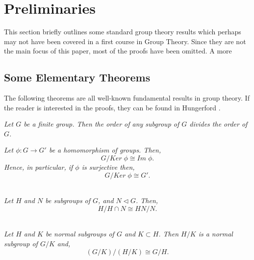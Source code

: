 \chapter{Preliminaries}\label{Ch1_Preliminaries}

This section briefly outlines some standard group theory results which perhaps may not have been covered in a first course in Group Theory. Since they are not the main focus of this paper, most of the proofs have been omitted. A more

\section{Some Elementary Theorems}

The following theorems are all well-known fundamental results in group theory. If the reader is interested in the proofs, they can be found in Hungerford \cite{hungerford}.

\begin{theorem}\label{lagrange} \textit{Let $G$ be a finite group. Then the order of any subgroup of $G$ divides the order of $G$.} \\
\end{theorem} 

\begin{theorem}\label{1stiso} \textit{Let $\phi  :G \rightarrow G'$ be a homomorphism of groups. Then, $$G/Ker \; \phi \cong Im \; \phi.$$ Hence, in particular, if $\phi$ is surjective then, $$G/Ker \; \phi \cong G'.$$} \\
\end{theorem} 

\vspace{-10mm}

\begin{theorem}\label{2ndiso} \textit{Let $H$ and $N$ be subgroups of $G$, and $N \vartriangleleft G$. Then, $$H/H \cap N \cong HN/N.$$} \\
\end{theorem} 

\vspace{-10mm}

\begin{theorem}\label{3rdiso} \textit{Let $H$ and $K$ be normal subgroups of $G$ and $K \subset H$. Then $H/K$ is a normal subgroup of $G/K$ and, $$(G/K)/(H/K) \cong G/H.$$} \\
\end{theorem} 

\vspace{-10mm}


